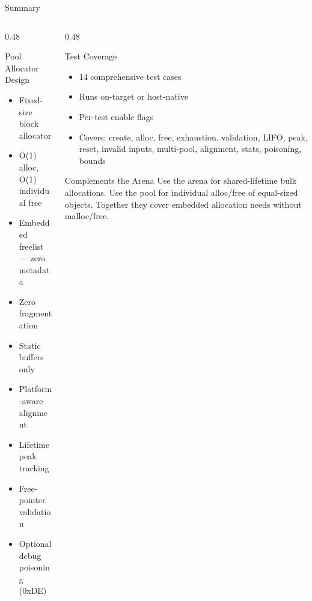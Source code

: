 \documentclass[aspectratio=169, 10pt]{beamer}
\begin{document}
\begin{frame}{Summary}
\begin{columns}[T]
\begin{column}{0.48\textwidth}
\begin{block}{Pool Allocator Design}
\begin{itemize}
  \item Fixed-size block allocator
  \item O(1) alloc, O(1) individual free
  \item Embedded freelist --- zero metadata
  \item Zero fragmentation
  \item Static buffers only
  \item Platform-aware alignment
  \item Lifetime peak tracking
  \item Free-pointer validation
  \item Optional debug poisoning (0xDE)
\end{itemize}
\end{block}
\end{column}

\begin{column}{0.48\textwidth}
\begin{block}{Test Coverage}
\begin{itemize}
  \item 14 comprehensive test cases
  \item Runs on-target or host-native
  \item Per-test enable flags
  \item Covers: create, alloc, free, exhaustion,
        validation, LIFO, peak, reset, invalid inputs,
        multi-pool, alignment, stats, poisoning, bounds
\end{itemize}
\end{block}

\vspace{0.3em}
\begin{alertblock}{Complements the Arena}
Use the arena for shared-lifetime bulk allocations.
Use the pool for individual alloc/free of equal-sized objects.
Together they cover embedded allocation needs without
malloc/free.
\end{alertblock}
\end{column}
\end{columns}
\end{frame}
\end{document}
